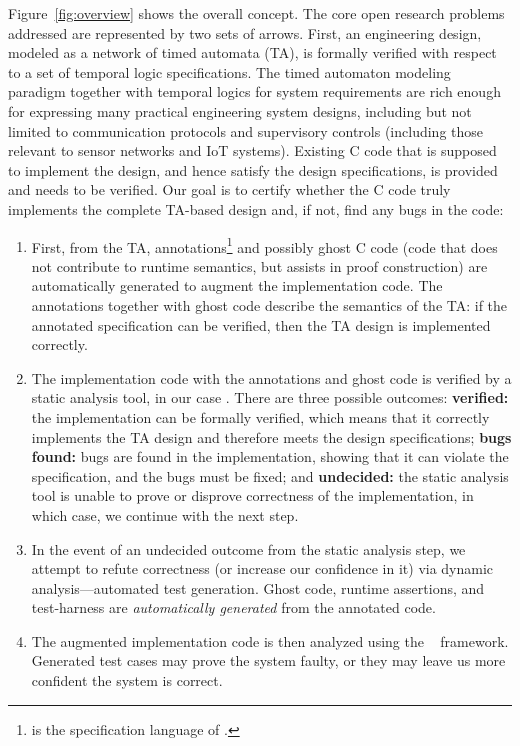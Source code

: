 Figure~\ref{fig:overview} shows the overall concept.  The core
open research problems addressed are represented by two sets of
arrows.  First, an engineering design, modeled as a network of timed
automata (TA), is formally verified with respect to a set of temporal logic specifications.
The timed automaton modeling paradigm together with temporal logics
for system requirements are rich enough for expressing many practical
engineering system designs, including but not limited to communication
protocols and supervisory controls (including those relevant to sensor
networks and IoT systems).  Existing C code that is supposed to
implement the design, and hence satisfy the design specifications, is provided and needs to be verified.
Our goal is to certify whether the C code truly implements the complete TA-based design and, if not, find any bugs in the code:
\begin{enumerate}[labelsep=3pt,leftmargin=12pt]
\item First, from the TA, \acsl annotations\footnote{\acsl is the
    specification language of \framac{}.} and possibly ghost C code
  (code that does not contribute to runtime semantics, but assists in
  proof construction) are automatically generated to augment the
  implementation code. The annotations together with ghost code
  describe the semantics of the TA: if
  the annotated specification can be verified, then the TA design is implemented correctly.
\item The implementation code with the \acsl annotations and ghost code
  is verified by a static analysis tool, in our case \framac.
  There are three possible outcomes:
  {\bf verified:} the implementation can be formally verified, which means that it correctly implements the TA design and therefore meets the design specifications;
  {\bf bugs found:} bugs are found in the implementation, showing that
    it can violate the specification, and the bugs must be fixed; and
  {\bf undecided:} the static analysis tool is unable to prove or disprove correctness of the implementation,
  in which case, we continue with the next step.
\item In the event of an undecided outcome from the static analysis
  step, we attempt to refute correctness (or increase our confidence
  in it) via dynamic analysis---automated test generation.
  Ghost code, runtime assertions, and test-harness are \emph{automatically generated} from the
  annotated code.
\item The augmented implementation code is then analyzed using the
  \deepstate~\cite{DeepState} framework.  Generated test cases may
  prove the system faulty, or they may leave us more confident
  the system is correct.
\end{enumerate}

